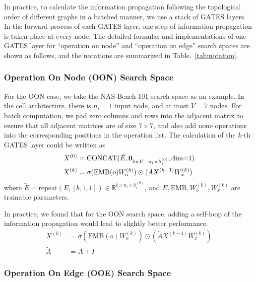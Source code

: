 \documentclass[runningheads]{llncs}
\begin{document}
In practice, to calculate the information propagation following the topological order of different graphs in a batched manner, we use a stack of GATES layers. In the forward process of each GATES layer, one step of information propagation is taken place at every node. The detailed formulas and implementations of one GATES layer for ``operation on node'' and ``operation on edge'' search spaces are shown as follows, and the notations are summarized in Table.~\ref{tab:notation}.

\subsubsection{Operation On Node (OON) Search Space}

For the OON case, we take the NAS-Bench-101 search space as an example. In the cell architecture, there is $n_i=1$ input node, and at most $V=7$ nodes. For batch computation, we pad zero columns and rows into the adjacent matrix to ensure that all adjacent matrices are of size $7\times7$, and also add none operations into the corresponding positions in the operation list. The calculation of the $k$-th GATES layer could be written as
\begin{equation}
\begin{aligned}
X^{(0)} &= \mbox{CONCAT}(\tilde{E}, {\bf 0}_{b \times V-n_i \times h_i^{(0)}}, \mbox{dim=1})\\
X^{(k)} &= \sigma(\mbox{EMB}(o) W^{(k)}_o) \odot (A X^{(k-1)} W^{(k)}_x)
\end{aligned}
\label{eq:gates_nasbench}
\end{equation}
where $\tilde{E} = \mbox{repeat}(E, [b, 1, 1]) \in \mathbb{R}^{b \times n_i \times h^{(0)}_i}$, and $E, \mbox{EMB}, W^{(k)}_o, W^{(k)}_x$ are trainable parameters.



In practice, we found that for the OON search space, adding a self-loop of the information propagation would lead to slightly better performance. 
\begin{equation}
    \begin{aligned}
        X^{(k)} &= \sigma(\mbox{EMB}(o) W^{(k)}_o) \odot (\tilde{A} X^{(k-1)} W^{(k)}_x) \\
        \tilde{A} &= A + I
    \end{aligned}
\end{equation}


\subsubsection{Operation On Edge (OOE) Search Space}
\end{document}

